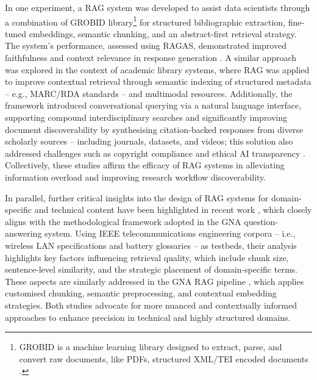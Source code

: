 \begin{spacing}{1.5}
In one experiment, a RAG system was developed to assist data scientists through a combination of GROBID library\footnote{GROBID is a machine learning library designed to extract, parse, and convert raw documents, like PDFs, structured XML/TEI encoded documents \citep{GROBID}.} for structured bibliographic extraction, fine-tuned embeddings, semantic chunking, and an abstract-first retrieval strategy. The system's performance, assessed using RAGAS, demonstrated improved faithfulness and context relevance in response generation \citep{aytar_retrieval-augmented_2024}. A similar approach was explored in the context of academic library systems, where RAG was applied to improve contextual retrieval through semantic indexing of structured metadata -- e.g., MARC/RDA standards -- and multimodal resources. Additionally, the framework introduced conversational querying via a natural language interface, supporting compound interdisciplinary searches and significantly improving document discoverability by synthesising citation-backed responses from diverse scholarly sources -- including journals, datasets, and videos; this solution also addressed challenges such as copyright compliance and ethical AI transparency \citep{bevara_prospects_2025}.  Collectively, these studies affirm the efficacy of RAG systems in alleviating information overload and improving research workflow discoverability.

In parallel, further critical insights into the design of RAG systems for domain-specific and technical content have been highlighted in recent work \citep{soman_observations_2024}, which closely aligns with the methodological framework adopted in the GNA question-answering system. Using IEEE telecommunications engineering corpora -- i.e., wireless LAN specifications and battery glossaries -- as testbeds, their analysis highlights key factors influencing retrieval quality, which include chunk size, sentence-level similarity, and the strategic placement of domain-specific terms. These aspects are similarly addressed in the GNA RAG pipeline \citep{pograri_question-answering_2025}, which applies customised chunking, semantic preprocessing, and contextual embedding strategies. Both studies advocate for more nuanced and contextually informed approaches to enhance precision in technical and highly structured domains.


\end{spacing}
